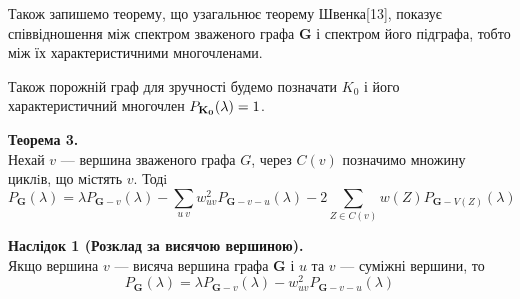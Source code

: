 Також запишемо теорему, що узагальнює теорему Швенка[13], показує співвідношення між спектром зваженого графа \textbf{G} і спектром його підграфа, тобто між їх характеристичними многочленами.

Також порожній граф для зручності будемо позначати $K_0$ і його характеристичний многочлен $P_{\bf K_0}(\lambda) = 1$. 

\textbf{Теорема 3.}\\
Нехай $v$ — вершина зваженого графа $G$, через $C(v)$ позначимо множину циклiв, що мiстять $v$. Тодi
\begin{equation}
    P_{\textbf{G}}(\lambda) = \lambda P_{\textbf{G}-v}(\lambda)-\sum_{u~v}w^2_{u v}P_{\textbf{G}-v-u}(\lambda) - 2\sum_{Z\in C(v)}w(Z)P_{\textbf{G}-V(Z)}(\lambda)
\end{equation}

\textbf{Наслідок 1 (Розклад за висячою вершиною).}\\
Якщо вершина $v$ --- висяча вершина графа \textbf{G} і $u$ та $v$ --- суміжні вершини, то
\begin{equation}
    P_{\textbf{G}}(\lambda) = \lambda P_{\textbf{G}-v}(\lambda)-w^2_{u v}P_{\textbf{G}-v-u}(\lambda) 
\end{equation}